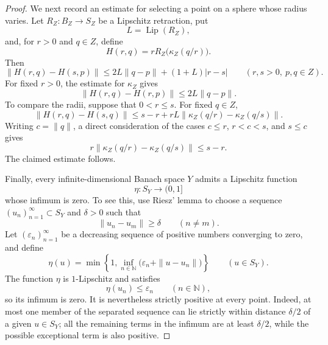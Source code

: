 \documentclass[11pt,reqno]{amsart}
\theoremstyle{plain}
\theoremstyle{definition}
\newcommand{\N}{\mathbb N}
\begin{document}
\begin{proof}
We next record an estimate for selecting a point on a sphere whose radius varies. Let $R_Z\colon B_Z\to S_Z$ be a Lipschitz retraction, put
\begin{equation*}
 L=\operatorname{Lip}(R_Z),
\end{equation*}
and, for $r>0$ and $q\in Z$, define
\begin{equation*}
 H(r,q)=rR_Z\bigl(\kappa_Z(q/r)\bigr).
\end{equation*}
Then
\begin{equation*}
 \|H(r,q)-H(s,p)\|
 \leq2L\|q-p\|+(1+L)|r-s|
 \qquad(r,s>0,\ p,q\in Z).
\end{equation*}
For fixed $r>0$, the estimate for $\kappa_Z$ gives
\begin{equation*}
 \|H(r,q)-H(r,p)\|\leq2L\|q-p\|.
\end{equation*}
To compare the radii, suppose that $0<r\leq s$. For fixed $q\in Z$,
\begin{equation*}
 \|H(r,q)-H(s,q)\|
 \leq s-r+rL\|\kappa_Z(q/r)-\kappa_Z(q/s)\|.
\end{equation*}
Writing $c=\|q\|$, a direct consideration of the cases $c\leq r$, $r<c<s$, and $s\leq c$ gives
\begin{equation*}
 r\|\kappa_Z(q/r)-\kappa_Z(q/s)\|\leq s-r.
\end{equation*}
The claimed estimate follows.

Finally, every infinite-dimensional Banach space $Y$ admits a Lipschitz function
\begin{equation*}
 \eta\colon S_Y\to(0,1]
\end{equation*}
whose infimum is zero. To see this, use Riesz' lemma to choose a sequence $(u_n)_{n=1}^{\infty}\subset S_Y$ and $\delta>0$ such that
\begin{equation*}
 \|u_n-u_m\|\geq\delta \qquad(n\ne m).
\end{equation*}
Let $(\varepsilon_n)_{n=1}^{\infty}$ be a decreasing sequence of positive numbers converging to zero, and define
\begin{equation*}
 \eta(u)=\min\left\{1,\inf_{n\in\N}
       \bigl(\varepsilon_n+\|u-u_n\|\bigr)\right\}
 \qquad(u\in S_Y).
\end{equation*}
The function $\eta$ is $1$-Lipschitz and satisfies
\begin{equation*}
 \eta(u_n)\leq\varepsilon_n \qquad(n\in\N),
\end{equation*}
so its infimum is zero. It is nevertheless strictly positive at every point. Indeed, at most one member of the separated sequence can lie strictly within distance $\delta/2$ of a given $u\in S_Y$; all the remaining terms in the infimum are at least $\delta/2$, while the possible exceptional term is also positive.


\end{proof}
\end{document}
